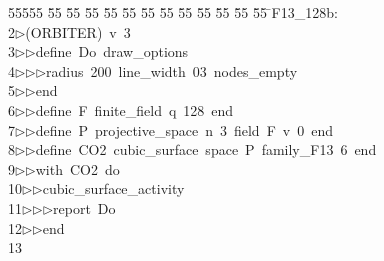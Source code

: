 %
%
\begin{tabbing}
55555 \= 55 \= 55 \= 55 \= 55 \= 55 \= 55 \= 55 \= 55 \= 55 \= 55 \= 55 \= 55 \= \>F13\_128b:\\[0pt]
2\>$\triangleright$\>(ORBITER)\ v\ 3\ \\[0pt]
3\>$\triangleright$\>$\triangleright$\>define\ Do\ draw\_options\ \\[0pt]
4\>$\triangleright$\>$\triangleright$\>$\triangleright$\>radius\ 200\ line\_width\ 03\ nodes\_empty\ \\[0pt]
5\>$\triangleright$\>$\triangleright$\>end\ \\[0pt]
6\>$\triangleright$\>$\triangleright$\>define\ F\ finite\_field\ q\ 128\ end\ \\[0pt]
7\>$\triangleright$\>$\triangleright$\>define\ P\ projective\_space\ n\ 3\ field\ F\ v\ 0\ end\ \\[0pt]
8\>$\triangleright$\>$\triangleright$\>define\ CO2\ cubic\_surface\ space\ P\ family\_F13\ 6\ end\ \\[0pt]
9\>$\triangleright$\>$\triangleright$\>with\ CO2\ do\ \\[0pt]
10\>$\triangleright$\>$\triangleright$\>cubic\_surface\_activity\ \\[0pt]
11\>$\triangleright$\>$\triangleright$\>$\triangleright$\>report\ Do\ \\[0pt]
12\>$\triangleright$\>$\triangleright$\>end\\[0pt]
13\>\end{tabbing}
